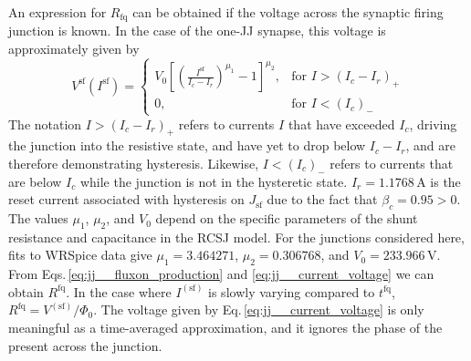 \documentclass[twocolumn]{article}
\begin{document}
An expression for $R_{\mathrm{fq}}$ can be obtained if the voltage across the synaptic firing junction is known. In the case of the one-JJ synapse, this voltage is approximately given by
\begin{equation}
\label{eq:jj__current_voltage}
V^{\mathrm{sf}}(I^{\mathrm{sf}}) = \begin{cases} V_0\left[ \left( \frac{I^{\mathrm{sf}}}{I_c-I_r} \right)^{\mu_1} - 1 \right]^{\mu_2}, & \text{for } I > (I_c-I_r)_+ \\
0, & \text{for } I < (I_c)_-
\end{cases}
\end{equation} 
The notation $I > (I_c-I_r)_+$ refers to currents $I$ that have exceeded $I_c$, driving the junction into the resistive state, and have yet to drop below $I_c-I_r$, and are therefore demonstrating hysteresis. Likewise, $I < (I_c)_-$ refers to currents that are below $I_c$ while the junction is not in the hysteretic state. $I_r = 1.1768$\,\textmu A is the reset current associated with hysteresis on $J_{\mathrm{sf}}$ due to the fact that $\beta_c = 0.95 > 0$. The values $\mu_1$, $\mu_2$, and $V_0$ depend on the specific parameters of the shunt resistance and capacitance in the RCSJ model. For the junctions considered here, fits to WRSpice data give $\mu_1 = 3.464271$, $\mu_2 = 0.306768$, and $V_0 = 233.966$\,\textmu V. From Eqs.\,\ref{eq:jj__fluxon_production} and \ref{eq:jj__current_voltage} we can obtain $R^{\mathrm{fq}}$. In the case where $I^{(\mathrm{sf})}$ is slowly varying compared to $t^{\mathrm{fq}}$, $R^{\mathrm{fq}} = V^{(\mathrm{sf})}/\Phi_0$. The voltage given by Eq.\,\ref{eq:jj__current_voltage} is only meaningful as a time-averaged approximation, and it ignores the phase of the present across the junction. 
\end{document}
